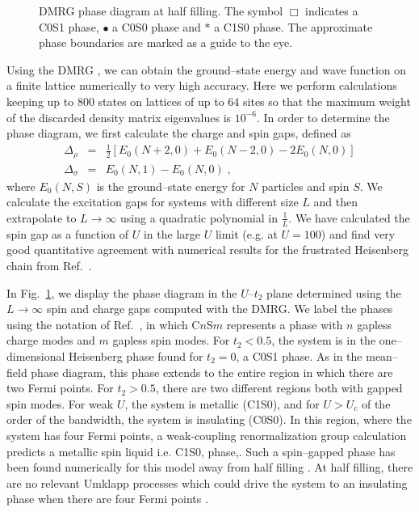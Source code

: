 \begin{figure}[htb]
\begin{center}
\end{center}
\caption{DMRG phase diagram at half filling. 
  The symbol $\Box$ indicates a C0S1 phase, $\bullet$ a C0S0 phase
  and $\ast$ a C1S0 phase. 
  The approximate phase boundaries are marked as a guide to
  the eye.}
\label{DMRGPhaseDiag}
\end{figure}

Using the DMRG \cite{White92}, we can obtain the ground--state energy
and wave function on a finite lattice numerically to very high accuracy.
Here we perform calculations keeping up to 800 states on lattices of up to 64
sites so that the maximum weight of the discarded density matrix
eigenvalues is $10^{-6}$. 
In order to determine the phase diagram, we first calculate
the charge and spin gaps, defined as
\begin{eqnarray}
  \Delta_\rho &=& \frac{1}{2} \left[ E_0(N+2,0) + E_0(N-2,0)
  -2E_0(N,0) \right] \\
  \Delta_\sigma &=& E_0(N,1) - E_0(N,0)   \; ,
\end{eqnarray}
%
where $E_0(N,S)$ is the ground--state energy for $N$ particles
and spin $S$. 
We calculate the excitation gaps for systems with different size $L$ and then
extrapolate to $L\rightarrow \infty$ 
using a quadratic polynomial in $\frac{1}{L}$.
We have calculated the spin gap as a function of $U$ in the large $U$
limit (e.g. at $U=100$) and find very good 
quantitative agreement with numerical results for the frustrated Heisenberg
chain from Ref.\ \cite{WhiteAffleck}.

In Fig.\ \ref{DMRGPhaseDiag}, we display the phase diagram in the
$U$--$t_2$ plane determined using the $L \rightarrow \infty$ spin and
charge gaps computed with the DMRG.
We label the phases using the notation of 
Ref.\ , in which C$n$S$m$ represents a
phase with $n$ gapless charge modes and $m$ gapless spin modes. 
For $t_2<0.5$, the system is in the one--dimensional Heisenberg phase
found for $t_2=0$, a C0S1 phase.
As in the mean--field phase diagram, this phase extends to the entire
region in which there are two Fermi points.
For $t_2>0.5$, there are two different regions both with gapped spin modes. 
For weak $U$, the system is metallic (C1S0),
and for $U > U_c$ of the order of the bandwidth, the
system is  insulating (C0S0).
In this region, where the system has four Fermi points, 
a weak-coupling renormalization group calculation predicts a metallic
spin liquid i.e. C1S0, phase,\cite{Fabrizio96}.
Such a spin--gapped phase has been found numerically for this model
away from half filling \cite{DaulNoack98}.
At half filling, there are no relevant Umklapp 
processes which could drive the system to an insulating phase when
there are four Fermi points \cite{Fabrizio96}.

